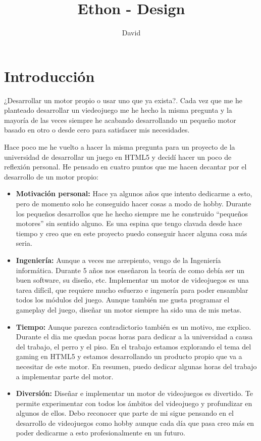 \documentclass[a4paper]{article}
\title{Ethon - Design}
\author{David}
\begin{document}
\maketitle 

\section{Introducción}

¿Desarrollar un motor propio o usar uno que ya exista?. Cada vez que me he planteado desarrollar un viedeojuego me he hecho la misma pregunta y la mayoría de las veces siempre he acabando desarrollando un pequeño motor basado en otro o desde cero para satisfacer mis necesidades.

Hace poco me he vuelto a hacer la misma pregunta para un proyecto de la universidad de desarrollar un juego en HTML5 y decidí hacer un poco de reflexión personal. He pensado en cuatro puntos que me hacen decantar por el desarrollo de un motor propio:

\begin{itemize}
  \item \textbf{Motivación personal:} Hace ya algunos años que intento dedicarme a esto, pero de momento solo he conseguido hacer cosas a modo de hobby. Durante los pequeños desarrollos que he hecho siempre me he construido ``pequeños motores'' sin sentido alguno. Es una espina que tengo clavada desde hace tiempo y creo que en este proyecto puedo conseguir hacer alguna cosa más seria.
  \item \textbf{Ingeniería:} Aunque a veces me arrepiento, vengo de la Ingeniería informática. Durante 5 años nos enseñaron la teoría de como debía ser un buen software, su diseño, etc. Implementar un motor de videojuegos es una tarea difícil, que requiere mucho esfuerzo e ingenería para poder ensamblar todos los módulos del juego. Aunque también me gusta programar el gameplay del juego, diseñar un motor siempre ha sido una de mis metas.

  \item \textbf{Tiempo:} Aunque parezca contradictorio también es un motivo, me explico. Durante el dia me quedan pocas horas para dedicar a la universidad a causa del trabajo, el perro y el piso. En el trabajo estamos explorando el tema del gaming en HTML5 y estamos desarrollando un producto propio que va a necesitar de este motor. En resumen, puedo dedicar algunas horas del trabajo a implementar parte del motor.

  \item \textbf{Diversión:} Diseñar e implementar un motor de videojuegos es divertido. Te permite experimentar con todos los ámbitos del videojuego y profundizar en algunos de ellos. Debo reconocer que parte de mi sigue pensando en el desarrollo de videojuegos como hobby aunque cada día que pasa creo más en poder dedicarme a esto profesionalmente en un futuro.
\end{itemize}
\end{document}
